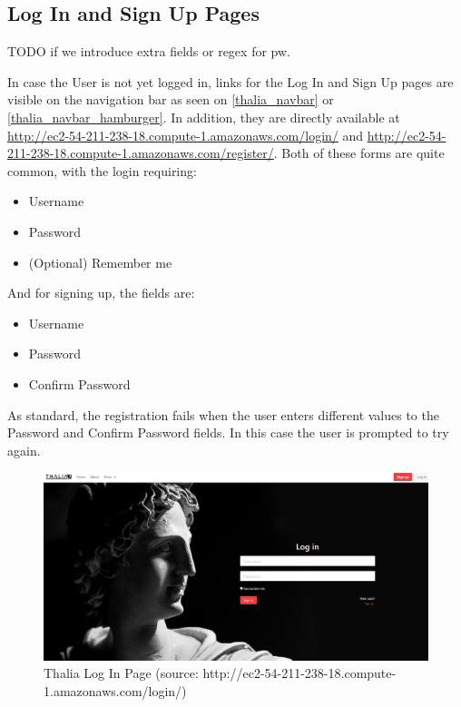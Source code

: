 \documentclass[main.tex]{subfiles}
\begin{document}
\subsection{Log In and Sign Up Pages}

TODO if we introduce extra  fields or regex for pw.

In case the User is not yet logged in, links for the Log In and Sign Up pages are visible on the navigation bar as seen on \figurename{\ref{thalia_navbar}} or \figurename{\ref{thalia_navbar_hamburger}}. In addition, they are directly available at \url{http://ec2-54-211-238-18.compute-1.amazonaws.com/login/} and \url{http://ec2-54-211-238-18.compute-1.amazonaws.com/register/}.
Both of these forms are quite common, with the login requiring:

\begin{itemize}
    \item Username
    \item Password
    \item (Optional) Remember me
\end{itemize}

And for signing up, the fields are:

\begin{itemize}
    \item Username
    \item Password
    \item Confirm Password
\end{itemize}

As standard, the registration fails when the user enters different values to the Password and Confirm Password fields. In this case the user is prompted to try again.

\begin{figure}[H]
   \centering
   \includegraphics[width=\textwidth]{10Appendices/081User/081Pictures/login.png}
   \caption{Thalia Log In Page (source: http://ec2-54-211-238-18.compute-1.amazonaws.com/login/)}
   \label{thalia_login}
\end{figure}
\end{document}
